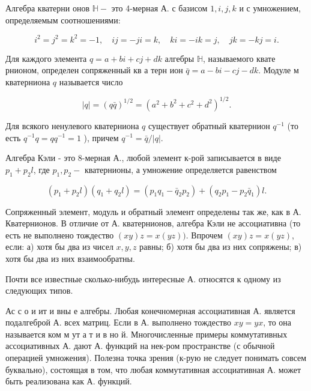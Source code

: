 \documentclass[10pt]{article}
\begin{document}
Алгебра кватерни онов $\mathbb{H}-$ это 4-мерная А. с базисом $1, i, j, k$ и с умножением, определяемым соотношениями:



\[

i^{2}=j^{2}=k^{2}=-1, \quad i j=-j i=k, \quad k i=-i k=j, \quad j k=-k j=i .

\]



Для каждого элемента $q=a+b i+c j+d k$ алгебры $\mathbb{H}$, называемого квате рнионом, определен сопряженный кв а терн ион $\bar{q}=a-b i-c j-d k$. Модуле м кватерниона $q$ называется число



\[

|q|=(q \bar{q})^{1 / 2}=\left(a^{2}+b^{2}+c^{2}+d^{2}\right)^{1 / 2} .

\]



Для всякого ненулевого кватерниона $q$ существует обратный кватернион $q^{-1}$ (то есть $q^{-1} q=q q^{-1}=1$ ), причем $q^{-1}=\bar{q} /|q|$.



Алгебра Кэли - это 8-мерная А., любой элемент к-рой записывается в виде $p_{1}+p_{2} l$, где $p_{1}, p_{2}-$ кватернионы, а умножение определяется равенством



\[

\left(p_{1}+p_{2} l\right)\left(q_{1}+q_{2} l\right)=\left(p_{1} q_{1}-\bar{q}_{2} p_{2}\right)+\left(q_{2} p_{1}-p_{2} \bar{q}_{1}\right) l .

\]



Сопряженный элемент, модуль и обратный элемент определены так же, как в А. Кватернионов. В отличие от А. кватернионов, алгебра Кэли не ассоциативна (то есть не выполнено тождество $(x y) z=x(y z))$. Впрочем $(x y) z=x(y z)$, если: а) хотя бы два из чисел $x, y, z$ равны; б) хотя бы два из них сопряжены; в) хотя бы два из них взаимообратны.



Почти все известные сколько-нибудь интересные А. относятся к одному из следующих типов.



Ас с о и ит и вны е алгебры. Любая конечномерная ассоциативная А. является подалгеброй А. всех матриц. Если в А. выполнено тождество $x y=y x$, то она называется ком м ут а т и в но й. Многочисленные примеры коммутативных ассоциативных А. дают А. функций на нек-ром пространстве (с обычной операцией умножения). Полезна точка зрения (к-рую не следует понимать совсем буквально), состоящая в том, что любая коммутативная ассоциативная А. может быть реализована как А. функций.
\end{document}
